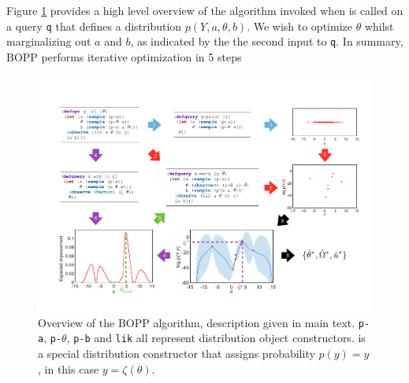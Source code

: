 Figure \ref{fig:bopp_overview} provides a high level overview of the algorithm invoked when \doopt is called on a query \texttt{q} that defines a distribution $p\left(Y, a, \theta , b\right)$.  We wish to optimize $\theta$ whilst marginalizing out $a$ and $b$, as indicated by the the second input to \texttt{q}. In summary, BOPP performs iterative optimization in 5 steps

\begin{figure}[t]
	\centering
	\includegraphics[width=\textwidth]{"bopp_overview_figure"}
	\caption{
		\label{fig:bopp_overview}
		Overview of the BOPP algorithm, description given in main text. \texttt{p-a}, \texttt{p-$\theta$}, \texttt{p-b} and \texttt{lik} all represent distribution object constructors. \factor is a special distribution constructor that assigns probability $p(y) = y$, in this case $y = \zeta(\theta)$.}
\end{figure}



